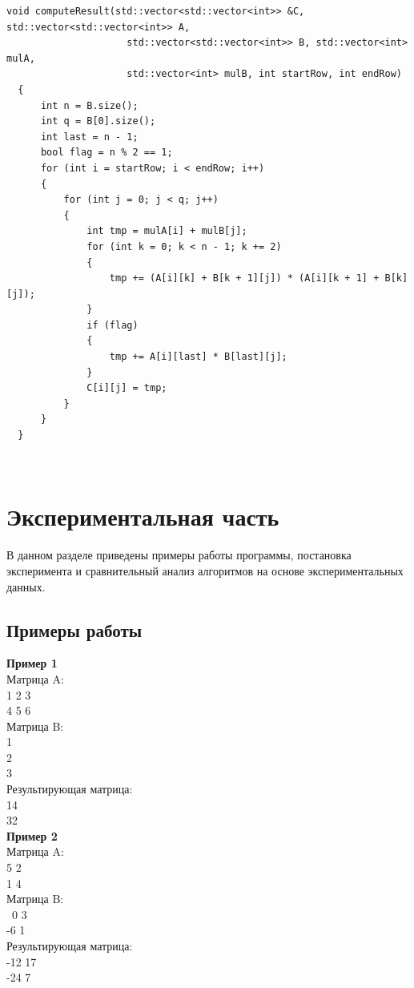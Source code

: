\documentclass[a4paper,12pt]{report}
\begin{document}
\begin{lstlisting}[caption=Функция вычисления результирующей матрицы]
  void computeResult(std::vector<std::vector<int>> &C, std::vector<std::vector<int>> A,
                     std::vector<std::vector<int>> B, std::vector<int> mulA,
                     std::vector<int> mulB, int startRow, int endRow)
  {
      int n = B.size();
      int q = B[0].size();
      int last = n - 1;
      bool flag = n % 2 == 1;
      for (int i = startRow; i < endRow; i++)
      {
          for (int j = 0; j < q; j++)
          {
              int tmp = mulA[i] + mulB[j];
              for (int k = 0; k < n - 1; k += 2)
              {
                  tmp += (A[i][k] + B[k + 1][j]) * (A[i][k + 1] + B[k][j]);
              }
              if (flag)
              {
                  tmp += A[i][last] * B[last][j];
              }
              C[i][j] = tmp;
          }
      }
  }
\end{lstlisting}
\

\chapter{Экспериментальная часть}
В данном разделе приведены примеры работы программы, постановка эксперимента и сравнительный анализ алгоритмов на основе экспериментальных данных.
\section{Примеры работы}
\hspace{0.6cm}\textbf {Пример 1}\\
Матрица A:\\
1 2 3\\
4 5 6\\
Матрица B:\\
1\\
2\\
3\\
Результирующая матрица:\\
14\\
32\\

\textbf {Пример 2}\\
Матрица A:\\
5 2\\
1 4\\
Матрица B:\\\
0 3\\
-6 1\\
Результирующая матрица:\\
-12 17\\
-24 7\\
\end{document}
